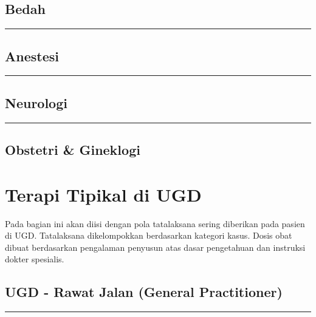 \documentclass[
]{book}
\begin{document}
\hypertarget{bedah}{%
\section{Bedah}\label{bedah}}

\begin{center}\rule{0.5\linewidth}{0.5pt}\end{center}

\hypertarget{anestesi}{%
\section{Anestesi}\label{anestesi}}

\begin{center}\rule{0.5\linewidth}{0.5pt}\end{center}

\hypertarget{neurologi}{%
\section{Neurologi}\label{neurologi}}

\begin{center}\rule{0.5\linewidth}{0.5pt}\end{center}

\hypertarget{obstetri-gineklogi}{%
\section{Obstetri \& Gineklogi}\label{obstetri-gineklogi}}

\hypertarget{terapi-tipikal-di-ugd}{%
\chapter{Terapi Tipikal di UGD}\label{terapi-tipikal-di-ugd}}

Pada bagian ini akan diisi dengan pola tatalaksana sering diberikan pada pasien di UGD. Tatalaksana dikelompokkan berdasarkan kategori kasus. Dosis obat dibuat berdasarkan pengalaman penyusun atas dasar pengetahuan dan instruksi dokter spesialis.

\hypertarget{ugd---rawat-jalan-general-practitioner}{%
\section{UGD - Rawat Jalan (General Practitioner)}\label{ugd---rawat-jalan-general-practitioner}}

\begin{center}\rule{0.5\linewidth}{0.5pt}\end{center}
\end{document}
